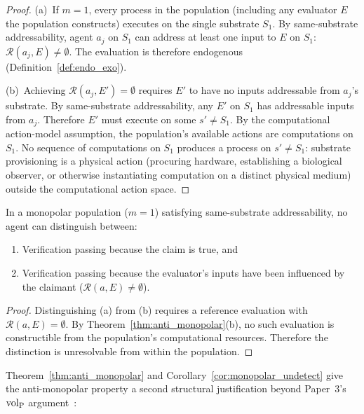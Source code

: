 \begin{proof}
(a)~If $m = 1$, every process in the population (including any
evaluator $E$ the population constructs) executes on the single
substrate $S_1$.  By same-substrate addressability, agent $a_j$ on
$S_1$ can address at least one input to $E$ on $S_1$:
$\mathcal{R}(a_j, E) \neq \emptyset$.  The evaluation is therefore
endogenous (Definition~\ref{def:endo_exo}).

(b)~Achieving $\mathcal{R}(a_j, E') = \emptyset$ requires $E'$ to have
no inputs addressable from $a_j$'s substrate.  By same-substrate
addressability, any $E'$ on $S_1$ has addressable inputs from $a_j$.
Therefore $E'$ must execute on some $s' \neq S_1$.  By the
computational action-model assumption, the population's available
actions are computations on $S_1$.  No sequence of computations on
$S_1$ produces a process on $s' \neq S_1$: substrate provisioning is a
physical action (procuring hardware, establishing a biological observer,
or otherwise instantiating computation on a distinct physical medium)
outside the computational action space.
\end{proof}

\begin{corollary}
\label{cor:monopolar_undetect}
In a monopolar population ($m = 1$) satisfying same-substrate
addressability, no agent can distinguish between:
\begin{enumerate}
    \item[(a)] Verification passing because the claim is true, and
    \item[(b)] Verification passing because the evaluator's inputs have
    been influenced by the claimant ($\mathcal{R}(a, E) \neq \emptyset$).
\end{enumerate}
\end{corollary}

\begin{proof}
Distinguishing (a) from (b) requires a reference evaluation with
$\mathcal{R}(a, E) = \emptyset$.  By Theorem~\ref{thm:anti_monopolar}(b),
no such evaluation is constructible from the population's computational
resources.  Therefore the distinction is unresolvable
from within the population.
\end{proof}

Theorem~\ref{thm:anti_monopolar} and Corollary~\ref{cor:monopolar_undetect}
give the anti-monopolar property a second structural justification beyond
Paper~3's ${\operatorname{vol}_{\mathrm{P}}}$ argument~\citep{lasser2026horizon}:

